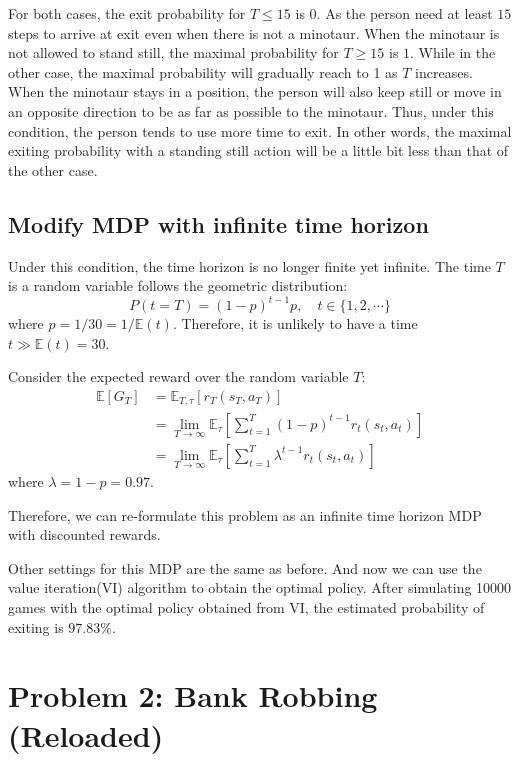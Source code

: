 \documentclass{article}
\begin{document}
For both cases, the exit probability for $T\leq 15$ is $0$. As the person need at least $15$ steps to arrive at exit even when there is not a minotaur.
When the minotaur is not allowed to stand still, the maximal probability for $T\geq 15$ is $1$. While in the other case, the maximal probability will gradually reach to 1 as $T$ increases.
When the minotaur stays in a position, the person will also keep still or move in an opposite direction to be as far as possible to the minotaur.
Thus, under this condition, the person tends to use more time to exit.
In other words, the maximal exiting probability with a standing still action will be a little bit less than that of the other case.

\subsection{Modify MDP with infinite time horizon}
Under this condition, the time horizon is no longer finite yet infinite.
The time $T$ is a random variable follows the geometric distribution:
\begin{equation*}
  P(t=T) = (1-p)^{t-1} p, \quad t \in \{1,2,\cdots\}
\end{equation*}
where $p=1 / 30 = 1 / \mathbb{E}(t)$. Therefore, it is unlikely to have a time $t \gg \mathbb{E}(t) = 30$.

Consider the expected reward over the random variable $T$:
\begin{align*}
  \mathbb{E}[G_{T}]
    &= \mathbb{E}_{T, \tau}[r_T(s_T, a_T)] \\
    &= \lim_{T\rightarrow\infty} \mathbb{E}_{\tau}\left[\sum_{t=1}^{T} (1-p)^{t-1} r_t(s_t, a_t)\right] \\
    &= \lim_{T\rightarrow\infty} \mathbb{E}_{\tau}\left[\sum_{t=1}^{T} \lambda^{t-1} r_t(s_t, a_t)\right]
\end{align*}
where $\lambda = 1- p = 0.97$.

Therefore, we can re-formulate this problem as an infinite time horizon MDP with discounted rewards.

Other settings for this MDP are the same as before. And now we can use the value iteration(VI) algorithm to obtain the optimal policy.
After simulating 10000 games with the optimal policy obtained from VI, the estimated probability of exiting is $97.83\%$.
\section{Problem 2: Bank Robbing (Reloaded)}
\end{document}
